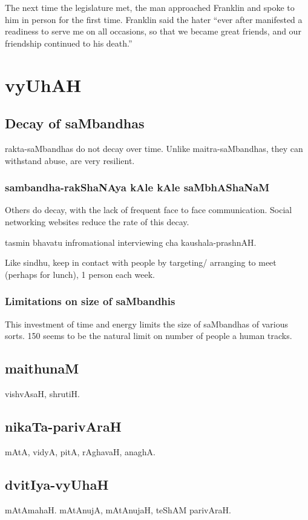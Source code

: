 \documentclass[oneside, article]{memoir}
\begin{document}
The next time the legislature met, the man approached Franklin and spoke to him in person for the first time. Franklin said the hater “ever after manifested a readiness to serve me on all occasions, so that we became great friends, and our friendship continued to his death.”


\chapter{vyUhAH}
\section{Decay of saMbandhas}
rakta-saMbandhas do not decay over time. Unlike maitra-saMbandhas, they can withstand abuse, are very resilient.

\subsection{sambandha-rakShaNAya kAle kAle saMbhAShaNaM}
Others do decay, with the lack of frequent face to face communication. Social networking websites reduce the rate of this decay.

tasmin bhavatu infromational interviewing cha kaushala-prashnAH.

Like sindhu, keep in contact with people by targeting/ arranging to meet (perhaps for lunch), 1 person each week.

\subsection{Limitations on size of saMbandhis}
This investment of time and energy limits the size of saMbandhas of various sorts. 150 seems to be the natural limit on number of people a human tracks.

\section{maithunaM}
vishvAsaH, shrutiH.

\section{nikaTa-parivAraH}
mAtA, vidyA, pitA, rAghavaH, anaghA.

\section{dvitIya-vyUhaH}
mAtAmahaH. mAtAnujA, mAtAnujaH, teShAM parivAraH.
\end{document}
